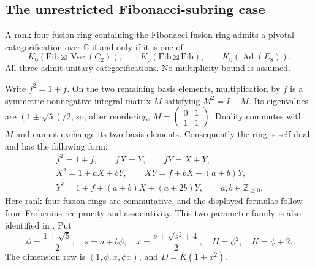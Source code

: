 \subsection{The unrestricted Fibonacci-subring case}
\label{sec:unbounded-fibonacci}

\begin{theorem}\label{thm:unbounded-fibonacci}
A rank-four fusion ring containing the Fibonacci fusion ring admits a
pivotal categorification over $\mathbb C$ if and only if it is one of
\[
 K_0(\mathrm{Fib}\boxtimes\operatorname{Vec}(C_2)),\qquad
 K_0(\mathrm{Fib}\boxtimes\mathrm{Fib}),\qquad
 K_0(\operatorname{Ad}(E_8)).
\]
All three admit unitary categorifications. No multiplicity bound is assumed.
\end{theorem}

Write $f^2=1+f$. On the two remaining basis elements, multiplication by
$f$ is a symmetric nonnegative integral matrix $M$ satisfying
$M^2=I+M$. Its eigenvalues are $(1\pm\sqrt5)/2$, so, after reordering,
$M=\left(\begin{smallmatrix}0&1\\1&1\end{smallmatrix}\right)$.
Duality commutes with $M$ and cannot exchange its two basis elements.
Consequently the ring is self-dual and has the following form:
\begin{equation}\label{eq:unbounded-fib-rules}
\begin{gathered}
 f^2=1+f,\qquad fX=Y,\qquad fY=X+Y,\\
 X^2=1+aX+bY,\qquad
 XY=f+bX+(a+b)Y,\\
 Y^2=1+f+(a+b)X+(a+2b)Y,
 \qquad a,b\in\mathbb Z_{\geq0}.
\end{gathered}
\end{equation}
Here rank-four fusion rings are commutative, and the displayed formulas
follow from Frobenius reciprocity and associativity. This two-parameter
family is also identified in \cite[Proposition~3.3]{DongRank4}.
Put
\[
 \phi=\frac{1+\sqrt5}{2},\quad s=a+b\phi,\quad
 x=\frac{s+\sqrt{s^2+4}}2,\quad H=\phi^2,\quad K=\phi+2.
\]
The dimension row is $(1,\phi,x,\phi x)$, and
$D=K(1+x^2)$.

